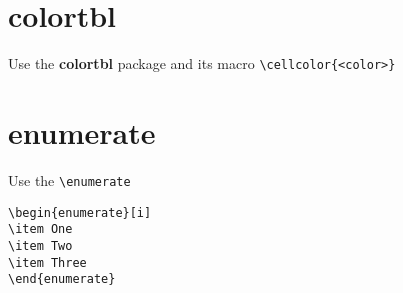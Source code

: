 \section{colortbl}
Use the \textbf{colortbl} package and its macro \lstinline[language={[LaTeX]TeX}]|\cellcolor{<color>}|

\section{enumerate}
Use the \lstinline[language={[LaTeX]TeX}]|\enumerate|

\begin{lstlisting}[language={[LaTeX]TeX}]
\begin{enumerate}[i]
\item One
\item Two
\item Three
\end{enumerate}
\end{lstlisting}